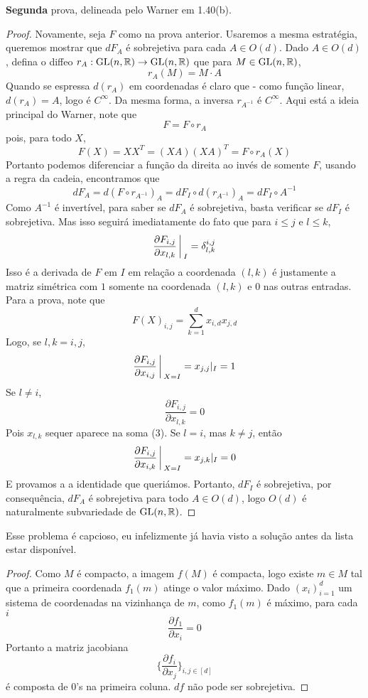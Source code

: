 \textbf{Segunda} prova, delineada pelo Warner em 1.40(b).
\begin{proof}
    Novamente, seja $F$ como na prova anterior. Usaremos a mesma estratégia, queremos mostrar 
    que $dF_A$ é sobrejetiva para cada $A \in O(d)$. Dado $A \in O(d)$, defina o diffeo $r_A : \text{GL}(n,\mathbb{R}) \rightarrow \text{GL}(n,\mathbb{R})$ 
    que para $M \in \text{GL}(n,\mathbb{R})$,
    $$r_A(M) = M\cdot A$$
    Quando se espressa $d(r_A)$ em coordenadas é claro que - como função linear, $d(r_A) = A$, logo é $C^\infty$. Da mesma forma, a inversa 
    $r_{A^{-1}}$ é $C^\infty$. Aqui está a ideia principal do Warner, note que 
    $$F = F \circ r_A$$
    pois, para todo $X$,
    $$F(X) = XX^T = (XA)(XA)^T = F \circ r_A (X)$$
    Portanto podemos diferenciar a função da direita ao invés de somente $F$, usando a regra da cadeia, encontramos que
    $$dF_A = d(F \circ r_{A^{-1}})_A = dF_{I} \circ d(r_{A^{-1}})_A = dF_{I} \circ A^{-1}$$
    Como $A^{-1}$ é invertível, para saber se $dF_A$ é sobrejetiva, basta verificar se $dF_I$ é sobrejetiva.
    Mas isso seguirá imediatamente do fato que para $i \leq j$ e $l \leq k$,
    $$\frac{\partial F_{i,j}}{\partial x_{l,k}}\bigg\arrowvert_I = \delta^{i,j}_{l,k}$$
    Isso é a derivada de $F$ em $I$ em relação a coordenada $(l,k)$ é justamente a matriz simétrica com $1$ somente na 
    coordenada $(l,k)$ e $0$ nas outras entradas.
    Para a prova, note que
    \begin{equation}
        F(X)_{i,j} = \sum_{k = 1}^{d} x_{i,d}  x_{j,d}
    \end{equation}
    Logo, se $l,k = i,j$,
    $$\frac{\partial F_{i,j}}{\partial x_{i,j}}\bigg\arrowvert_{X = I} = x_{j,j}|_I = 1$$
    Se $l \neq i$,
    $$\frac{\partial F_{i,j}}{\partial x_{l,k}} = 0$$
    Pois $x_{l,k}$ sequer aparece na soma (3). Se $l = i$, mas $k \neq j$,
    então
    $$\frac{\partial F_{i,j}}{\partial x_{i,k}}\bigg\arrowvert_{X = I} = x_{j,k}|_I = 0$$
    E provamos a a identidade que queriámos. Portanto, $dF_I$ é sobrejetiva, por consequência, $dF_A$ é sobrejetiva 
    para todo $A \in O(d)$, logo $O(d)$ é naturalmente subvariedade de $\text{GL}(n,\mathbb{R})$.


\end{proof}


\begin{problem}
    \label{prob:l2:5}
\end{problem}
Esse problema é capcioso, eu infelizmente já havia visto a solução antes da lista estar disponível.
\begin{proof}
    Como $M$ é compacto, a imagem $f(M)$ é compacta, logo existe $m \in M$ tal que a primeira coordenada $f_1(m)$ atinge o valor máximo.
    Dado $(x_i)_{i=1}^d$ um sistema de coordenadas na vizinhança de $m$,  como $f_1(m)$ é máximo, para cada $i$
    $$\frac{\partial f_1}{\partial x_i} = 0$$
    Portanto a matriz jacobiana 
    $$\bigg\{ \frac{\partial f_i}{\partial x_j}\bigg\}_{i,j \in [d]}$$
    é composta de $0$'s na primeira coluna. $df$ não pode ser sobrejetiva.  
\end{proof}